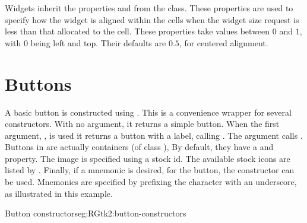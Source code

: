 Widgets inherit the properties  and  from
the  class. These properties are used to specify how
the widget is aligned within the cells when the widget size request is
less than that allocated to the cell. These properties take values between $0$ and
$1$, with $0$ being left and top. Their defaults are $0.5$, for centered alignment.








\section{Buttons}
\label{sec:RGtk2:gtkButton}

A basic button is constructed using . This is a
convenience wrapper for several constructors. With no argument, it
returns a simple button. When the first argument, , is
used it returns a button with a label, calling
. The  argument
calls .  Buttons in \GTK\/ are
actually containers (of class ), By default, they have a
 and  property. The image is specified using a
stock id. The available stock icons are listed by
. Finally, if a mnemonic is desired, for the
button, the constructor  can be
used. Mnemonics are specified by prefixing the character with an
underscore, as illustrated in this example.

\begin{example}{Button constructors}{eg:RGtk2:button-constructors}
\begin{Schunk}
\end{Schunk}
\end{example}

